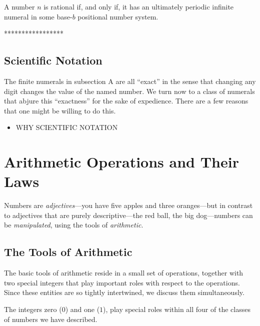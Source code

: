 \begin{prop}
\label{thm:rational-iff-periodic-numeral}
A number $n$ is rational if, and only if, it has an ultimately
periodic infinite numeral in some base-$b$ positional number system.
\end{prop}

*****************

\subsection{Scientific Notation}
\label{sec:scientific-notation}

The finite numerals in subsection A are all ``exact'' in the sense
that changing any digit changes the value of the named number.  We
turn now to a class of numerals that abjure this ``exactness'' for the
sake of expedience.  There are a few reasons that one might be willing
to do this.

\begin{itemize}
\item
WHY SCIENTIFIC NOTATION
\end{itemize}


\section{Arithmetic Operations and Their Laws}
\label{sec:Arithmetic-Tools+Laws}

Numbers are {\it adjectives}---you have
five apples and three oranges---but in contrast to adjectives that are
purely descriptive---the red ball, the big dog---numbers can be {\em
  manipulated}, using the
tools of {\it arithmetic}.

\subsection{The Tools of Arithmetic}
\label{sec:arithmetic-tools}

The basic tools of arithmetic reside in a small set of operations,
together with two special integers that play important roles with
respect to the operations.  Since these entities are so tightly
intertwined, we discuss them simultaneously.

\smallskip

%
The integers zero ($0$) and one
($1$), play special roles within all four of
the classes of numbers we have described.

